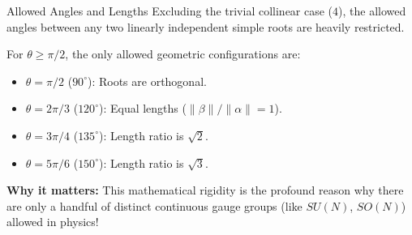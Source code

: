 \begin{frame}{Allowed Angles and Lengths}
    Excluding the trivial collinear case ($4$), the allowed angles between any two linearly independent simple roots are heavily restricted.

    \vspace{0.3cm}
    For $\theta \ge \pi/2$, the only allowed geometric configurations are:
    \begin{itemize}
        \item $\theta = \pi/2$ ($90^\circ$): Roots are orthogonal.
        \item $\theta = 2\pi/3$ ($120^\circ$): Equal lengths ($\|\beta\|/\|\alpha\| = 1$).
        \item $\theta = 3\pi/4$ ($135^\circ$): Length ratio is $\sqrt{2}$.
        \item $\theta = 5\pi/6$ ($150^\circ$): Length ratio is $\sqrt{3}$.
    \end{itemize}

    \vspace{0.3cm}
    \textbf{Why it matters:} This mathematical rigidity is the profound reason why there are only a handful of distinct continuous gauge groups (like $SU(N)$, $SO(N)$) allowed in physics!
\end{frame}